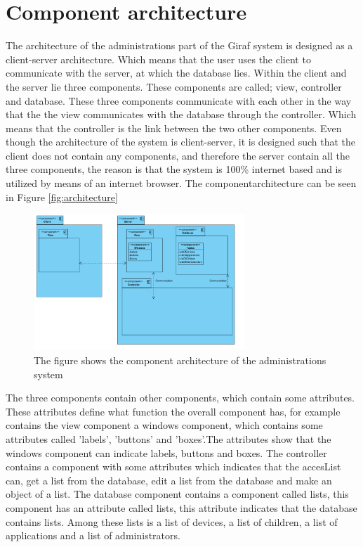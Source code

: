\section{Component architecture}

The architecture of the administrations part of the Giraf system is designed as a client-server architecture. Which means that the user uses the client to communicate with the server, at which the database lies. Within the client and the server lie three components. These components are called; view, controller and database. These three components communicate with each other in the way that the the view communicates with the database through the controller. Which means that the controller is the link between the two other components. Even though the architecture of the system is client-server, it is designed such that the client does not contain any components, and therefore the server contain all the three components, the reason is that the system is 100\% internet based and is utilized by means of an internet browser. The componentarchitecture can be seen in Figure \vref{fig:architecture}

\begin{figure}[!ht]
\centering
\includegraphics[width=300px]{img/ComponentArketektur.png}
\caption{The figure shows the component architecture of the administrations system}
\label{fig:architecture}
\end{figure}

The three components contain other components, which contain some attributes. These attributes define what function the overall component has, for example contains the view component a windows component, which contains some attributes called 'labels', 'buttons' and 'boxes'.The attributes show that the windows component can indicate labels, buttons and boxes.
The controller contains a component with some attributes which indicates that the accesList can, get a list from the database, edit a list from the database and make an object of a list.
The database component contains a component called lists, this component has an attribute called lists, this attribute indicates that the database contains lists. Among these lists is a list of devices, a list of children, a list of applications and a list of administrators.